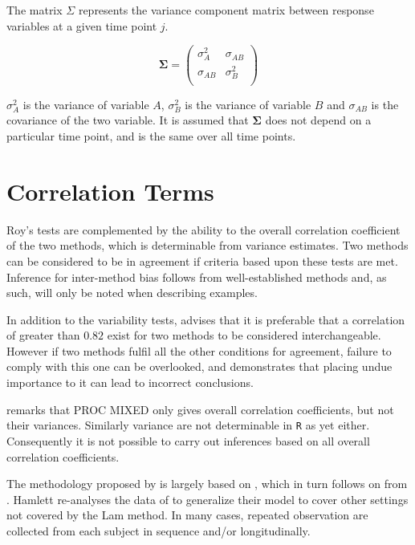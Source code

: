 \documentclass[12pt, a4paper]{report}
\theoremstyle{plain}
\theoremstyle{definition}
\theoremstyle{remark}
\begin{document}
		The matrix $\Sigma$ represents the variance component matrix between response variables at a given time point $j$.
		
		\[
		\boldsymbol{\Sigma} = \left( \begin{array}{cc}
		\sigma^2_{A} & \sigma_{AB} \\
		\sigma_{AB} & \sigma^2_{B}\\
		\end{array}   \right)
		\]
		
		$\sigma^2_{A}$ is the variance of variable $A$, $\sigma^2_{B}$ is the variance of variable $B$ and $\sigma_{AB}$ is the covariance of the two variable. It is assumed that $\boldsymbol{\Sigma}$ does not depend on a particular time point, and is the same over all time points.
		



\section{Correlation Terms}
	
Roy's tests are complemented by the ability to the overall correlation coefficient of the two methods, which is determinable from variance estimates. Two methods can be considered to be in agreement if criteria based upon these tests are met. Inference for inter-method bias follows from well-established methods and, as such, will only be noted when describing examples.
	
	
In addition to the variability tests, \citet{ARoy2009} advises that it is preferable that a correlation of greater than $0.82$ exist for two methods to be considered interchangeable. However if two methods fulfil all the other conditions for agreement, failure to comply with this one can be overlooked, and demonstrates that placing undue importance to it can lead to incorrect conclusions.
	
\citet{ARoy2009} remarks that PROC MIXED only gives overall correlation coefficients, but not their variances. Similarly variance are not determinable in \texttt{R} as yet either. Consequently it is not possible to carry out inferences based on all overall correlation coefficients.
	
	
	
	


The methodology proposed by \citet{ARoy2009} is largely based on \citet{hamlett}, which in turn follows on from \citet{lam}. Hamlett re-analyses the data of \citet{lam} to generalize their model to cover other settings not covered by the Lam method. In many cases, repeated observation are collected from each subject in sequence  and/or longitudinally.
\end{document}
